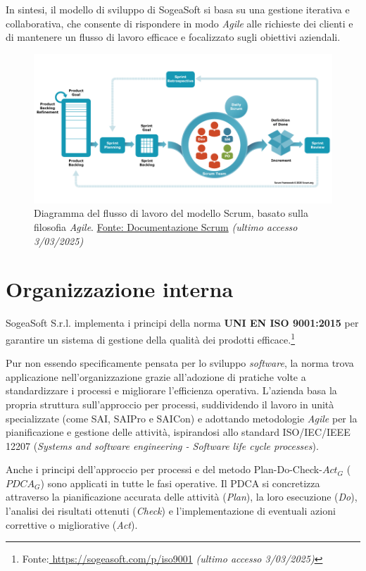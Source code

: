    \noindent In sintesi, il modello di sviluppo di SogeaSoft si basa su una gestione iterativa e collaborativa, che consente di rispondere in modo \textit{Agile} alle richieste dei clienti e di mantenere un flusso di lavoro efficace e focalizzato sugli obiettivi aziendali.

    \begin{figure}[H]
        \centering
        \includegraphics[width=0.8\linewidth]{BCS-Tessi/images/scrum_flow.png}
        \caption[Diagramma del modello Scrum]{Diagramma del flusso di lavoro del modello Scrum, basato sulla filosofia \textit{Agile}. \href{https://www.scrum.org/learning-series/what-is-scrum/}{Fonte: Documentazione Scrum} \textit{(ultimo accesso 3/03/2025)}}
        \label{fig:scrum_flow}
    \end{figure}
    
    \section{Organizzazione interna}
    SogeaSoft S.r.l. implementa i principi della norma \textbf{UNI EN ISO 9001:2015} per garantire un sistema di gestione della qualità dei prodotti efficace.\footnote{Fonte:\href{https://sogeasoft.com/p/iso9001}{ https://sogeasoft.com/p/iso9001} \textit{(ultimo accesso 3/03/2025)}}
    
    
    \noindent Pur non essendo specificamente pensata per lo sviluppo \textit{software}, la norma trova applicazione nell’organizzazione grazie all’adozione di pratiche volte a standardizzare i processi e migliorare l’efficienza operativa. L'azienda basa la propria struttura sull'approccio per processi, suddividendo il lavoro in unità specializzate (come SAI, SAIPro e SAICon) e adottando metodologie \textit{Agile} per la pianificazione e gestione delle attività, ispirandosi allo standard ISO/IEC/IEEE 12207 (\textit{Systems and software engineering - Software life cycle processes}).

    \noindent Anche i principi dell’approccio per processi e del metodo Plan-Do-Check-$Act_G$ ($PDCA_G$) sono applicati in tutte le fasi operative. Il PDCA si concretizza attraverso la pianificazione accurata delle attività (\textit{Plan}), la loro esecuzione (\textit{Do}), l’analisi dei risultati ottenuti (\textit{Check}) e l’implementazione di eventuali azioni correttive o migliorative (\textit{Act}).

